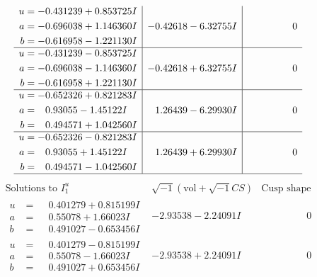 \documentclass[1p]{elsarticle_modified}
\theoremstyle{definition}
\newcommand{\I}{\sqrt{-1}}
\begin{document}
$$\begin{array}{c|c|c}
\begin{aligned}
u &= -0.431239 + 0.853725 I \\
a &= -0.696038 + 1.146360 I \\
b &= -0.616958 - 1.221130 I\end{aligned}
 & -0.42618 - 6.32755 I & \phantom{-0.000000 } 0 \\ \hline\begin{aligned}
u &= -0.431239 - 0.853725 I \\
a &= -0.696038 - 1.146360 I \\
b &= -0.616958 + 1.221130 I\end{aligned}
 & -0.42618 + 6.32755 I & \phantom{-0.000000 } 0 \\ \hline\begin{aligned}
u &= -0.652326 + 0.821283 I \\
a &= \phantom{-}0.93055 - 1.45122 I \\
b &= \phantom{-}0.494571 + 1.042560 I\end{aligned}
 & \phantom{-}1.26439 - 6.29930 I & \phantom{-0.000000 } 0 \\ \hline\begin{aligned}
u &= -0.652326 - 0.821283 I \\
a &= \phantom{-}0.93055 + 1.45122 I \\
b &= \phantom{-}0.494571 - 1.042560 I\end{aligned}
 & \phantom{-}1.26439 + 6.29930 I & \phantom{-0.000000 } 0\\
 \hline 
 \end{array}$$\newpage$$\begin{array}{c|c|c}  
\text{Solutions to }I^u_{1}& \I (\text{vol} + \sqrt{-1}CS) & \text{Cusp shape}\\
 \hline 
\begin{aligned}
u &= \phantom{-}0.401279 + 0.815199 I \\
a &= \phantom{-}0.55078 + 1.66023 I \\
b &= \phantom{-}0.491027 - 0.653456 I\end{aligned}
 & -2.93538 - 2.24091 I & \phantom{-0.000000 } 0 \\ \hline\begin{aligned}
u &= \phantom{-}0.401279 - 0.815199 I \\
a &= \phantom{-}0.55078 - 1.66023 I \\
b &= \phantom{-}0.491027 + 0.653456 I\end{aligned}
 & -2.93538 + 2.24091 I & \phantom{-0.000000 } 0 \\ \hline\begin{aligned}

\end{aligned}
\end{array}$$
\end{document}
